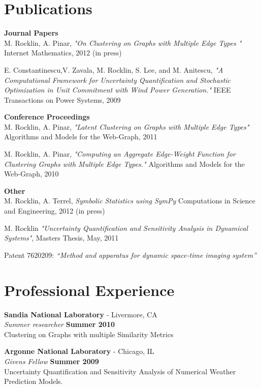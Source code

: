\documentclass[margin,line]{res}
\begin{document}
\begin{resume}
\section{\sc Publications}

{\bf Journal Papers}\\
M. Rocklin, A. Pinar, \textit{"On Clustering on Graphs with Multiple Edge Types
"} Internet Mathematics, 2012 (in press)

E. Constantinescu,V. Zavala, M. Rocklin, S. Lee, and M. Anitescu, \textit{"A Computational Framework for Uncertainty Quantification and Stochastic Optimization in Unit Commitment with Wind Power Generation."} IEEE Transactions on Power Systems, 2009


{\bf Conference Proceedings}\\
M. Rocklin, A. Pinar, \textit{"Latent Clustering on Graphs with Multiple Edge Types"} Algorithms and Models for the Web-Graph, 2011

M. Rocklin, A. Pinar, \textit{"Computing an Aggregate Edge-Weight Function for Clustering Graphs with Multiple Edge Types."} Algorithms and Models for the Web-Graph, 2010

{\bf Other}\\
M. Rocklin, A. Terrel, \textit{Symbolic Statistics using SymPy} Computations in
Science and Engineering, 2012 (in press)

M. Rocklin \textit{"Uncertainty Quantification and Sensitivity Analysis in Dynamical Systems"}, Masters Thesis, May, 2011

Patent 7620209: \textit{“Method and apparatus for dynamic space-time imaging system”}

\section{\sc Professional Experience}

{\bf Sandia National Laboratory } - Livermore, CA\\
{\em Summer researcher} \hfill {\bf Summer 2010}\\
Clustering on Graphs with multiple Similarity Metrics 

{\bf Argonne National Laboratory} - Chicago, IL\\
{\em Givens Fellow} \hfill {\bf Summer 2009}\\
Uncertainty Quantification and Sensitivity Analysis of Numerical Weather Prediction Models.


\end{resume}
\end{document}
